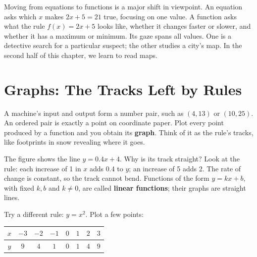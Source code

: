 Moving from equations to functions is a major shift in viewpoint. An equation asks which $x$ makes $2x + 5 = 21$ true, focusing on one value. A function asks what the rule $f(x) = 2x + 5$ looks like, whether it changes faster or slower, and whether it has a maximum or minimum. Its gaze spans all values. One is a detective search for a particular suspect; the other studies a city's map. In the second half of this chapter, we learn to read maps.

\section{Graphs: The Tracks Left by Rules}

A machine's input and output form a number pair, such as $(4, 13)$ or $(10, 25)$. An ordered pair is exactly a point on coordinate paper. Plot every point produced by a function and you obtain its \textbf{graph}. Think of it as the rule's tracks, like footprints in snow revealing where it goes.

\begin{center}
\end{center}

The figure shows the line $y = 0.4x + 4$. Why is its track straight? Look at the rule: each increase of 1 in $x$ adds 0.4 to $y$; an increase of 5 adds 2. The rate of change is constant, so the track cannot bend. Functions of the form $y = kx + b$, with fixed $k,b$ and $k \neq 0$, are called \textbf{linear functions}; their graphs are straight lines.

Try a different rule: $y = x^2$. Plot a few points:

\begin{center}
\begin{tabular}{cccccccc}
\toprule
$x$ & $-3$ & $-2$ & $-1$ & $0$ & $1$ & $2$ & $3$ \\
\midrule
$y$ & $9$ & $4$ & $1$ & $0$ & $1$ & $4$ & $9$ \\
\bottomrule
\end{tabular}
\end{center}


